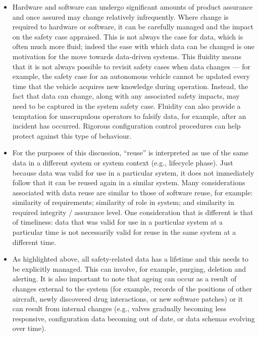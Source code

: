 \begin{itemize}
  \item {} Hardware and software can undergo significant amounts of product assurance and once assured may change relatively infrequently. Where change is required to hardware or software, it can be carefully managed and the impact on the safety case appraised. This is not always the case for data, which is often much more fluid; indeed the ease with which data can be changed is one motivation for the move towards \glspl{data-driven system}. This fluidity means that it is not always possible to revisit safety cases when data changes --- for example, the safety case for an autonomous vehicle cannot be updated every time that the vehicle acquires new knowledge during operation. Instead, the fact that data can change, along with any associated safety impacts, may need to be captured in the system safety case. Fluidity can also provide a temptation for unscrupulous operators to falsify data, for example, after an incident has occurred. Rigorous configuration control procedures can help protect against this type of behaviour.

  \item {} For the purposes of this discussion, ``reuse'' is interpreted as use of the same data in a different system or system context (e.g., lifecycle phase). Just because data was valid for use in a particular system, it does not immediately follow that it can be reused again in a similar system. Many considerations associated with data reuse are similar to those of software reuse, for example: similarity of requirements; similarity of role in system; and similarity in required integrity / assurance level. One consideration that is different is that of timeliness: data that was valid for use in a particular system at a particular time is not necessarily valid for reuse in the same system at a different time.

  \item {} As highlighted above, all safety-related data has a lifetime and this needs to be explicitly managed. This can involve, for example, purging, deletion and alerting. It is also important to note that ageing can occur as a result of changes external to the system (for example, records of the positions of other aircraft, newly discovered drug interactions, or new software patches) or it can result from internal changes (e.g., valves gradually becoming less responsive, \gls{configuration data} becoming out of date, or data schemas evolving over time).


\end{itemize}
